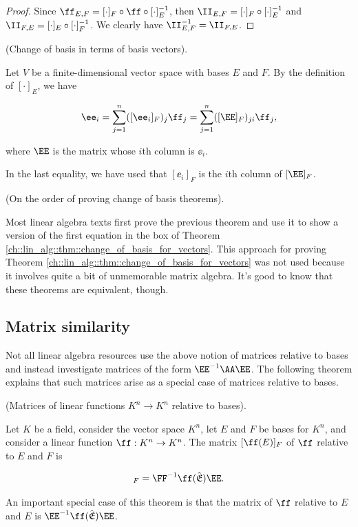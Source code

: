 \begin{proof}
    Since $\ff_{E,F} = [\cdot]_F \circ \ff \circ [\cdot]_E^{-1}$, then $\II_{E,F} = [\cdot]_F \circ [\cdot]_E^{-1}$ and $\II_{F,E} = [\cdot]_E \circ [\cdot]_F^{-1}$. We clearly have $\II_{E,F}^{-1} = \II_{F,E}$.
\end{proof}

\begin{theorem}
\label{ch::lin_alg::thm::change_of_basis_with_basis_vectors}
    (Change of basis in terms of basis vectors).
    
    Let $V$ be a finite-dimensional vector space with bases $E$ and $F$. By the definition of $[\cdot]_E$, we have
    
    \begin{align*}
        \ee_i = \sum_{j = 1}^n ([\ee_i]_F)_j \ff_j = \sum_{j = 1}^n ([\EE]_F)_{ji} \ff_j,
    \end{align*}
    
    where $\EE$ is the matrix whose $i$th column is $\ee_i$.
    
    In the last equality, we have used that $[\ee_i]_F$ is the $i$th column of $[\EE]_F$.
\end{theorem}

\begin{remark}
    (On the order of proving change of basis theorems). 
    
    Most linear algebra texts first prove the previous theorem and use it to show a version of the first equation in the box of Theorem \ref{ch::lin_alg::thm::change_of_basis_for_vectors}. This approach for proving Theorem \ref{ch::lin_alg::thm::change_of_basis_for_vectors} was not used because it involves quite a bit of unmemorable matrix algebra. It's good to know that these theorems are equivalent, though.
\end{remark}

\newpage

\subsection*{Matrix similarity}

Not all linear algebra resources use the above notion of matrices relative to bases and instead investigate matrices of the form $\EE^{-1} \AA \EE$. The following theorem explains that such matrices arise as a special case of matrices relative to bases.

\begin{theorem}
    (Matrices of linear functions $K^n \rightarrow K^n$ relative to bases).
    
    Let $K$ be a field, consider the vector space $K^n$, let $E$ and $F$ be bases for $K^n$, and consider a linear function $\ff:K^n \rightarrow K^n$. The matrix $[\ff(E)]_F$ of $\ff$ relative to $E$ and $F$ is
    
    \begin{align*}
        [\ff(E)]_F = \FF^{-1} \ff(\sE) \EE.
    \end{align*}

    An important special case of this theorem is that the matrix of $\ff$ relative to $E$ and $E$ is $\EE^{-1} \ff(\sE) \EE$.
\end{theorem}

